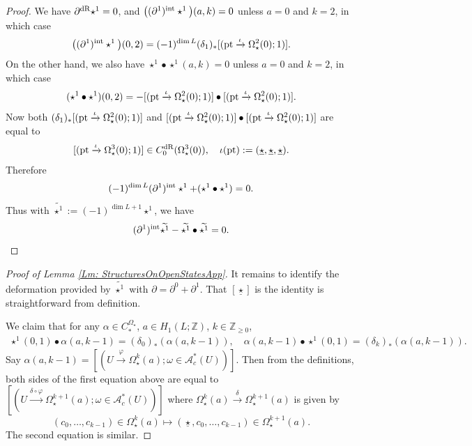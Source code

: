 \documentclass[10pt]{amsart}
\numberwithin{equation}{section}
\theoremstyle{plain}
\theoremstyle{definition}
\theoremstyle{remark}
\numberwithin{equation}{section}
\newcommand{\Z}{\mathbb{Z}}
\newcommand{\wt}[1]{\widetilde{#1}}
\newcommand{\dR}{\textup{dR}}
\newcommand{\pt}{\textup{pt}}
\newcommand{\CBa}{C_*^{\Omega_\star}}
\begin{document}
{\begin{proof}
	We have $\partial^\dR \star^1=0$, and $\big((\partial^1)^{\textup{int}}\star^1\big) (a,k) = 0$ unless $a=0$ and $k=2$, in which case
	\begin{align*} 
		\big((\partial^1)^{\textup{int}}\star^1\big) (0,2) = (-1)^{\dim L} (\delta_1)_*[(\pt \xrightarrow{\iota}\Omega^2_\star(0);1) ].
	\end{align*}
	On the other hand, we also have $\star^1 \bullet \star^1(a,k)=0$ unless $a=0$ and $k=2$, in which case
	\[
		(\star^1 \bullet \star^1)(0,2) = -[(\pt \xrightarrow{\iota}\Omega^2_\star(0);1) ] \bullet [(\pt \xrightarrow{\iota}\Omega^2_\star(0);1) ].
	\]
	Now both $(\delta_1)_*[(\pt \xrightarrow{\iota}\Omega^2_\star(0);1) ]$ and $[(\pt \xrightarrow{\iota}\Omega^2_\star(0);1) ]\bullet [(\pt \xrightarrow{\iota}\Omega^2_\star(0);1) ]$ are equal to 
	\[
		[(\pt \xrightarrow{\iota} \Omega^3_\star(0);1)]\in C_0^\dR(\Omega^3_\star(0)), \quad \iota(\pt) := (\underline{\star},\underline{\star},\underline{\star}).
	\]
	Therefore \[ (-1)^{\dim L}(\partial^1)^{\textup{int}}\star^1 + (\star^1\bullet \star^1) = 0. \]
	Thus with $\wt{\star^1}:= (-1)^{\dim L + 1}\star^1$, we have \[ (\partial^1)^{\textup{int}} \wt{\star^1} - \wt{\star^1} \bullet \wt{\star^1} =0.  \]
\end{proof}




\begin{proof}
	[Proof of Lemma \ref{Lm: StructuresOnOpenStatesApp}]
	It remains to identify the deformation provided by  $\wt{\star^1}$ with $\partial = \partial^0+\partial^1$.
	That $[\underline{\star}]$ is the identity is straightforward from definition.
	
	We claim that for any $\alpha \in \CBa$, $a\in H_1(L;\Z)$, $k\in \Z_{\geq 0}$,
	\begin{align*}
		\star^1(0,1)\bullet \alpha (a,k-1) = (\delta_0)_*(\alpha(a,k-1)), \quad \alpha(a,k-1) \bullet \star^1(0,1) = (\delta_k)_*(\alpha(a,k-1)).
	\end{align*}
	Say $\alpha(a,k-1) = [(U\xrightarrow{\varphi} \Omega^k_\star(a);\omega \in\mathscr{A}_c^*(U))]$. Then from the definitions, both sides of the first equation above are equal to $[(U\xrightarrow{ \delta \circ\varphi}\Omega^{k+1}_\star(a); \omega \in \mathscr{A}_c^*(U))]$ where $\Omega_\star^k(a)\xrightarrow{\delta} \Omega^{k+1}_\star(a)$ is given by \[ (c_0,\dots, c_{k-1}) \in \Omega_\star^k(a) \mapsto  (\underline{\star}, c_0,\dots, c_{k-1}) \in \Omega^{k+1}_\star(a). \]
	The second equation is similar.
	

\end{proof}}
\end{document}
